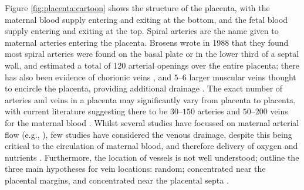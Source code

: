         Figure \ref{fig:placenta:cartoon} shows the structure of the placenta, with the maternal blood supply entering and exiting at the bottom, and the fetal blood supply entering and exiting at the top. Spiral arteries are the name given to maternal arteries entering the placenta. Brosens wrote in 1988 \cite{kaufmannPlacentalVascularizationBlood1988} that they found most spiral arteries were found on the basal plate or in the lower third of a septal wall, and estimated a total of 120 arterial openings over the entire placenta; there has also been evidence of chorionic veins \cite{benirschkePathologyHumanPlacenta2012}, and $5$--$6$ larger muscular veins thought to encircle the placenta, providing additional drainage \cite{nanaevHumanPlacentaEncircled2000}. The exact number of arteries and veins in a placenta may significantly vary from placenta to placenta, with current literature suggesting there to be $30$--$150$ arteries and $50$--$200$ veins for the maternal blood \cite{benirschkePathologyHumanPlacenta2012,chernyavskyMathematicalModelIntervillous2010,burtonRheologicalPhysiologicalConsequences2009}. Whilst several studies have focussed on maternal arterial flow (e.g., \cite{burtonRheologicalPhysiologicalConsequences2009,jamesTrophoblastPlugsImpact2018,saghianAssociationPlacentalJets2017,collinsDevelopmentalChangesSpiral2012}), few studies have considered the venous drainage, despite this being critical to the circulation of maternal blood, and therefore delivery of oxygen and nutrients \cite{hutchinsonFirstVivoDemonstration2020}. Furthermore, the location of vessels is not well understood; \citeauthor{chernyavskyMathematicalModelIntervillous2010} \cite{chernyavskyMathematicalModelIntervillous2010} outline the three main hypotheses for vein locations: random; concentrated near the placental margins, and concentrated near the placental septa \cite{boydHumanPlacenta1970}.

